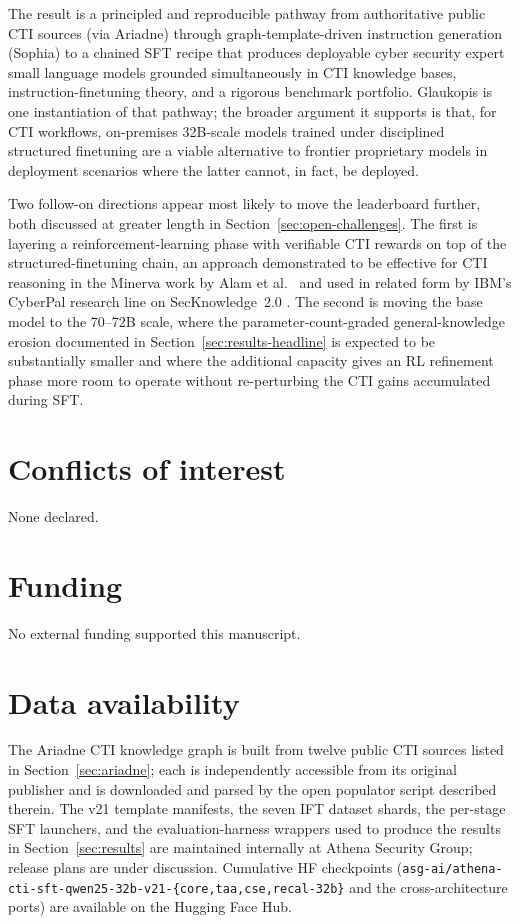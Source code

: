 \documentclass[unnumsec,webpdf,contemporary,large]{oup-authoring-template}
\theoremstyle{thmstyleone}
\theoremstyle{thmstyletwo}
\theoremstyle{thmstylethree}
\begin{document}
The result is a principled and reproducible pathway from authoritative public CTI sources (via Ariadne) through graph-template-driven instruction generation (Sophia) to a chained SFT recipe that produces deployable cyber security expert small language models grounded simultaneously in CTI knowledge bases, instruction-finetuning theory, and a rigorous benchmark portfolio. Glaukopis is one instantiation of that pathway; the broader argument it supports is that, for CTI workflows, on-premises 32B-scale models trained under disciplined structured finetuning are a viable alternative to frontier proprietary models in deployment scenarios where the latter cannot, in fact, be deployed.

Two follow-on directions appear most likely to move the leaderboard further, both discussed at greater length in Section~\ref{sec:open-challenges}. The first is layering a reinforcement-learning phase with verifiable CTI rewards on top of the structured-finetuning chain, an approach demonstrated to be effective for CTI reasoning in the Minerva work by Alam et al.\ \cite{alam2026minerva} and used in related form by IBM's CyberPal research line on SecKnowledge~2.0 \cite{levi2025toward}. The second is moving the base model to the 70--72B scale, where the parameter-count-graded general-knowledge erosion documented in Section~\ref{sec:results-headline} is expected to be substantially smaller and where the additional capacity gives an RL refinement phase more room to operate without re-perturbing the CTI gains accumulated during SFT.


\section{Conflicts of interest}
None declared.

\section{Funding}
No external funding supported this manuscript.

\section{Data availability}
The Ariadne CTI knowledge graph is built from twelve public CTI sources listed in Section~\ref{sec:ariadne}; each is independently accessible from its original publisher and is downloaded and parsed by the open populator script described therein. The v21 template manifests, the seven IFT dataset shards, the per-stage SFT launchers, and the evaluation-harness wrappers used to produce the results in Section~\ref{sec:results} are maintained internally at Athena Security Group; release plans are under discussion. Cumulative HF checkpoints (\texttt{asg-ai/athena-cti-sft-qwen25-32b-v21-\{core,taa,cse,recal-32b\}} and the cross-architecture ports) are available on the Hugging Face Hub.
\end{document}
